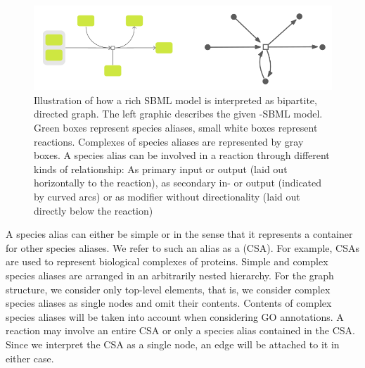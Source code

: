 \documentclass[
	fontsize=10pt, %
	twoside=true, %
	secnumdepth=1, %
  toc=indentunnumbered %
]{kaobook}
\begin{document}
\begin{figure}[h]
  \centering
  \includegraphics[width=0.7\linewidth]{graph-interpretation.png}
  \caption[Illustration how a rich SBML model is interpreted as a
  graph.]{Illustration of how a rich SBML model is interpreted as bipartite,
    directed graph. The left graphic describes the given -SBML model. Green
    boxes represent species aliases, small white boxes represent reactions.
    Complexes of species aliases are represented by gray boxes. A species alias
    can be involved in a reaction through different kinds of relationship: As
    primary input or output (laid out horizontally to the reaction), as
    secondary in- or output (indicated by curved arcs) or as modifier without
    directionality (laid out directly below the reaction)}
  \label{fig:graph-construction}
\end{figure}



A species alias can either be simple or  in the sense that it
represents a container for other species aliases. We refer to such an alias as a
 (CSA). For example, CSAs are used to represent
biological complexes of proteins. Simple and complex species aliases are
arranged in an arbitrarily nested hierarchy. For the graph structure, we
consider only top-level elements, that is, we consider complex species aliases
as single nodes and omit their contents. Contents of complex species aliases
will be taken into account when considering GO annotations. A reaction may
involve an entire CSA or only a species alias contained in the CSA. Since we
interpret the CSA as a single node, an edge will be attached to it in either
case.
\end{document}
